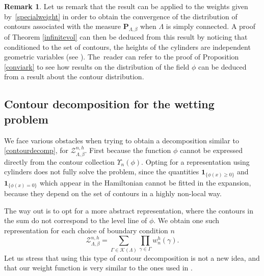 \documentclass[JEP,XML,SOM,Unicode, NoFloatCountersInSection]{cedram}
\let\mathcal\mathscr
\numberwithin{equation}{section}
\theoremstyle{plain}
\theoremstyle{definition}
\newtheorem{rem}[theorem]{Remark}
\newcommand{\ind}{\mathbf{1}}
\newcommand{\cZ}{{\ensuremath{\mathcal Z}} }
\newcommand{\cK}{{\ensuremath{\mathcal K}} }
\newcommand{\bP}{{\ensuremath{\mathbf P}} }
\newcommand{\gb}{\beta}
\newcommand{\gG}{\Gamma}
\newcommand{\gL}{\Lambda}
\begin{document}
\begin{rem}
Let us remark that the result can be applied to the weights given by~\eqref{specialweight} in order to obtain the convergence of the distribution
of contours associated with the measure $\bP_{\gL,\gb}$ when $\gL$ is simply connected.
A proof of Theorem \ref{infinitevol} can then be deduced from this result by noticing that conditioned to the set of contours, the heights of the cylinders are
independent geometric variables (see \eg \cite[Lem.\,4.3]{cf:part1}). The~reader can refer to the proof of Proposition \ref{conviark} to see
how results on the distribution of the field $\phi$ can be deduced from a result about the contour distribution.
\end{rem}

\subsection{Contour decomposition for the wetting problem} \label{contsec}

We face various obstacles when trying to obtain a decomposition similar to \eqref{contourdecomp}, for $\cZ^{n,h}_{\gL,\gb}$.
First because the function $\phi$ cannot be expressed directly from the contour collection $\Upsilon_n(\phi)$.
Opting for a representation using cylinders does not fully solve the problem,
since the quantities $\ind_{\{\phi(x)\ge 0\}}$ and $\ind_{\{ \phi(x)=0\}}$ which appear in the Hamiltonian cannot be fitted in the expansion,
because they depend on the set of contours in a highly non-local way.

The way out is to opt for a more abstract representation, where the contours in the sum do not correspond to the level line of $\phi$.
We obtain one such representation for each choice of boundary condition $n$
\begin{equation}\label{reprezent}
\cZ^{n,h}_{\gL,\gb}= \sum_{\gG\in \cK(\gL)} \prod_{\gamma\in \gG} w^h_n(\gamma).
\end{equation}
Let us stress that using this type of contour decomposition is not a new idea, and that our
weight function is very similar to the ones used \eg in \cite{cf:ADM, cf:CM}.
\end{document}
